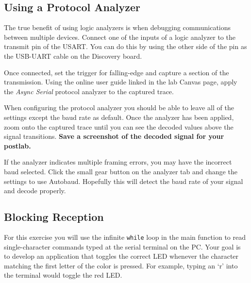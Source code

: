 \documentclass[openany,11pt,fleqn]{book} %
\begin{document}
\subsection{Using a Protocol Analyzer}
The true benefit of using logic analyzers is when debugging communications between multiple devices. Connect one of the inputs of a logic analyzer to the transmit pin of the USART. You can do this by using the other side of the pin as the USB-UART cable on the Discovery board.

Once connected, set the trigger for falling-edge and capture a section of the transmission. Using the online user guide linked in the lab Canvas page, apply the \textit{Async Serial} protocol analyzer to the captured trace. 

When configuring the protocol analyzer you should be able to leave all of the settings except the baud rate as default. Once the analyzer has been applied, zoom onto the captured trace until you can see the decoded values above the signal transitions. \textbf{Save a screenshot of the decoded signal for your postlab. }

If the analyzer indicates multiple framing errors, you may have the incorrect baud selected. Click the small gear button on the analyzer tab and change the settings to use Autobaud. Hopefully this will detect the baud rate of your signal and decode properly. 



\subsection{Blocking Reception}

For this exercise you will use the infinite \texttt{while} loop in the main function to read single-character commands typed at the serial terminal on the PC. Your goal is to develop an application that toggles the correct LED whenever the character matching the first letter of the color is pressed. For example, typing an `r' into the terminal would toggle the red LED. 
\end{document}
